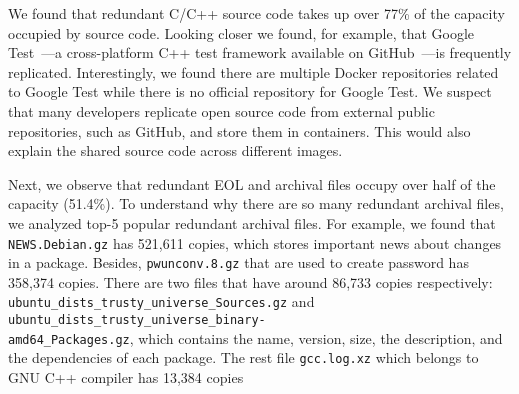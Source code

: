 We found that redundant C/C++ source code takes up over 77\% of the capacity
occupied by source code.
%
Looking closer we found, for example, that Google Test~\cite{googletest}---a
cross-platform C++ test framework available on GitHub~\cite{github}---is
frequently replicated.
%
%
Interestingly, we found there are multiple Docker repositories  related to Google Test while there is no official
repository for Google Test.
%
We suspect that many developers replicate open source code from external public
repositories, such as GitHub, and store them in containers.
%
This would also explain the shared source code across different images.
%
% 
%
%
%

Next, we observe that redundant EOL and archival files occupy over half of the
capacity (51.4\%). 
%
To understand why there are so many redundant archival files, 
%
we analyzed top-5 popular redundant archival files.
For example, we found that \texttt{NEWS.Debian.gz} has 521,611 copies,
which stores important news about changes in a package.
Besides, \texttt{pwunconv.8.gz} that are used to create password has 358,374 copies.
There are two files that have around 86,733 copies respectively:
\texttt{ubuntu\_dists\_trusty\_universe\_Sources.gz} and
\texttt{ubuntu\_dists\_trusty\_universe\_binary-\\amd64\_Packages.gz}, which
contains the name, version, size, the description, and the dependencies of each package.
%
The rest file \texttt{gcc.log.xz} which belongs to GNU C++ compiler
 has 13,384 copies
%
%
%
%
%
%
 

